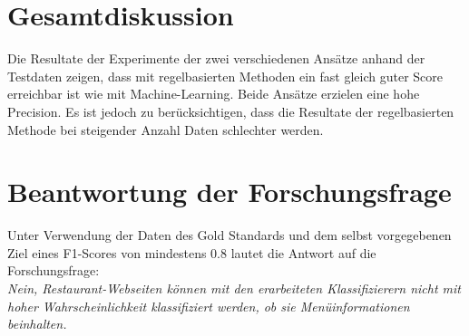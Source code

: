 \section{Gesamtdiskussion}
Die Resultate der Experimente der zwei verschiedenen Ansätze anhand der Testdaten zeigen, dass mit regelbasierten Methoden ein fast gleich guter Score erreichbar ist wie mit Machine-Learning.
Beide Ansätze erzielen eine hohe Precision.
Es ist jedoch zu berücksichtigen, dass die Resultate der regelbasierten Methode bei steigender Anzahl Daten schlechter werden.

\section{Beantwortung der Forschungsfrage}
Unter Verwendung der Daten des Gold Standards und dem selbst vorgegebenen Ziel eines F1-Scores von mindestens 0.8 lautet die Antwort auf die Forschungsfrage:\\
\emph{Nein, Restaurant-Webseiten können mit den erarbeiteten Klassifizierern nicht mit hoher Wahrscheinlichkeit klassifiziert werden, ob sie Menüinformationen beinhalten.}


